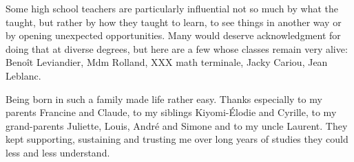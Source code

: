 Some high school teachers are particularly influential not so much by what the taught, but rather by how they taught to learn, to see things in another way or by opening unexpected opportunities. Many would deserve acknowledgment for doing that at diverse degrees, but here are a few whose classes remain very alive: Beno\^{i}t Leviandier, Mdm Rolland, XXX math terminale, Jacky Cariou, Jean Leblanc.

Being born in such a family made life rather easy. Thanks especially to my parents Francine and Claude, to my siblings Kiyomi-\'{E}lodie and Cyrille, to my grand-parents Juliette, Louis, Andr\'{e} and Simone and to my uncle Laurent. They kept supporting, sustaining and trusting me over long years of studies they could less and less understand.